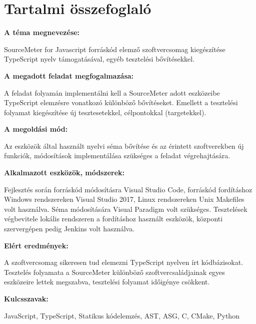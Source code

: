 \chapter*{Tartalmi összefoglaló}

\noindent\textbf{A téma megnevezése:}

\noindent SourceMeter for Javascript forráskód elemző szoftvercsomag kiegészítése TypeScript nyelv támogatásával, egyéb tesztelési bővítésekkel.

\noindent\textbf{A megadott feladat megfogalmazása:}

\noindent A feladat folyamán implementálni kell a SourceMeter adott eszközeibe TypeScript elemzésre vonatkozó különböző bővítéseket. Emellett a tesztelési folyamat kiegészítése új tesztesetekkel, célpontokkal (targetekkel).

\noindent\textbf{A megoldási mód:}

\noindent Az eszközök által használt nyelvi séma bővítése és az érintett szoftverekben új funkciók, módosítások implementálása szükséges a feladat végrehajtására.

\noindent\textbf{Alkalmazott eszközök, módszerek:}

\noindent Fejlesztés során forráskód módosításra Visual Studio Code, forráskód fordításhoz Windows rendszereken Visual Studio 2017, Linux rendszereken Unix Makefiles volt használva. Séma módosítására Visual Paradigm volt szükséges. Tesztelések végbevitele lokális rendszeren a fordításhoz használt eszközök, központi szervergépen pedig Jenkins volt használva.

\noindent\textbf{Elért eredmények:}

\noindent A szoftvercsomag sikeresen tud elemezni TypeScript nyelven írt kódbázisokat. Tesztelés folyamata a SourceMeter különböző szoftvercsaládjainak egyes eszközeire lettek megszabva, tesztelési folyamat időigénye csökkent.

\noindent\textbf{Kulcsszavak:}

\noindent JavaScript, TypeScript, Statikus kódelemzés, AST, ASG, C, CMake, Python
